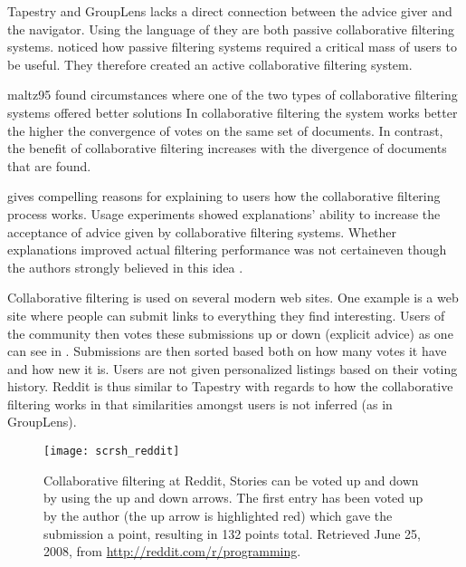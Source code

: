 Tapestry and GroupLens lacks a direct connection
between the advice giver and the navigator. Using the language of
\citet{dieberger97} they are both passive collaborative filtering systems.
\citet{maltz95} noticed how passive filtering systems required a
critical mass of users to be useful. They therefore created an active
collaborative filtering system.
\begin{fullquote}{maltz95}{%
  found circumstances where one of the two types of collaborative filtering
  systems offered better solutions}
    In  collaborative filtering the system works better the higher
    the convergence of votes on the same set of documents. In contrast, the
    benefit of  collaborative filtering increases with the
    divergence of documents that are found.
\end{fullquote}

\citet[]{herlocker00} gives compelling reasons for explaining to
users how the collaborative filtering process works. Usage experiments
showed explanations' ability to increase the acceptance of advice given by
collaborative filtering systems. Whether explanations improved actual
filtering performance was not certain\dash{}even though the authors
strongly believed in this idea
\citep[]{herlocker00}.

Collaborative filtering is used on several modern web sites. One example is
\dash{}a web site where people can submit links to everything
they find interesting. Users of the community then votes these submissions up
or down (explicit advice) as one can see in .
Submissions are then
sorted based both on how many votes it have and how new it is. Users are not
given personalized listings based on their voting history. Reddit is thus
similar to Tapestry with regards to how the collaborative filtering works in
that similarities amongst users is not inferred (as in GroupLens).

\begin{figure}
  \texttt{[image: scrsh\_reddit]}
  \caption[Collaborative Filtering at Reddit]{
    Collaborative filtering at Reddit, Stories can be voted up and down
    by using the up and down arrows. The first entry has been voted up by
    the author (the up arrow is highlighted red) which gave the submission
    a point, resulting in 132 points total.
    Retrieved June 25, 2008, from
    \url{http://reddit.com/r/programming}.
  }
  \label{figure:scrsh.reddit}
\end{figure}

